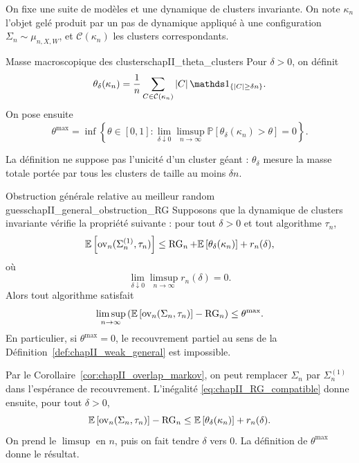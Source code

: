 On fixe une suite de modèles et une dynamique de clusters invariante. On note $\kappa_n$ l'objet gelé produit par un pas de dynamique appliqué à une configuration $\Sigma_n\sim\mu_{n,X,W}$, et $\mathcal C(\kappa_n)$ les clusters correspondants.

\begin{Definition}{Masse macroscopique des clusters}{chapII_theta_clusters}
Pour $\delta>0$, on définit
\begin{equation}
    \theta_\delta(\kappa_n)
    =
    \frac1n\sum_{C\in\mathcal C(\kappa_n)}|C|\,\ind{|C|\ge \delta n}.
    \label{eq:chapII_theta_delta}
\end{equation}
On pose ensuite
\begin{equation}
    \theta^{\max}
    =
    \inf\left\{\theta\in[0,1]:
    \lim_{\delta\downarrow0}\limsup_{n\to\infty}
    \mathbb P\left[\theta_\delta(\kappa_n)>\theta\right]=0
    \right\}.
    \label{eq:chapII_theta_max}
\end{equation}
\end{Definition}

La définition ne suppose pas l'unicité d'un cluster géant : $\theta_\delta$ mesure la masse totale portée par tous les clusters de taille au moins $\delta n$.

\begin{Theoreme}{Obstruction générale relative au meilleur random guess}{chapII_general_obstruction_RG}
Supposons que la dynamique de clusters invariante vérifie la propriété suivante : pour tout $\delta>0$ et tout algorithme $\tau_n$,
\begin{equation}
    \mathbb E\left[\operatorname{ov}_n(\Sigma_n^{(1)},\tau_n)\right]
    \le
    \operatorname{RG}_n+
    \mathbb E\left[\theta_\delta(\kappa_n)\right]+r_n(\delta),
    \label{eq:chapII_RG_compatible}
\end{equation}
où
\[
    \lim_{\delta\downarrow0}\limsup_{n\to\infty}r_n(\delta)=0.
\]
Alors tout algorithme satisfait
\begin{equation}
    \limsup_{n\to\infty}
    \left(
    \mathbb E\left[\operatorname{ov}_n(\Sigma_n,\tau_n)\right]-\operatorname{RG}_n
    \right)
    \le
    \theta^{\max}.
    \label{eq:chapII_general_obstruction_RG}
\end{equation}
En particulier, si $\theta^{\max}=0$, le recouvrement partiel au sens de la Définition~\ref{def:chapII_weak_general} est impossible.
\end{Theoreme}

\begin{Preuve}
Par le Corollaire~\ref{cor:chapII_overlap_markov}, on peut remplacer $\Sigma_n$ par $\Sigma_n^{(1)}$ dans l'espérance de recouvrement. L'inégalité \eqref{eq:chapII_RG_compatible} donne ensuite, pour tout $\delta>0$,
\[
    \mathbb E\left[\operatorname{ov}_n(\Sigma_n,\tau_n)\right]-\operatorname{RG}_n
    \le
    \mathbb E\left[\theta_\delta(\kappa_n)\right]+r_n(\delta).
\]
On prend le $\limsup$ en $n$, puis on fait tendre $\delta$ vers $0$. La définition de $\theta^{\max}$ donne le résultat.
\end{Preuve}

